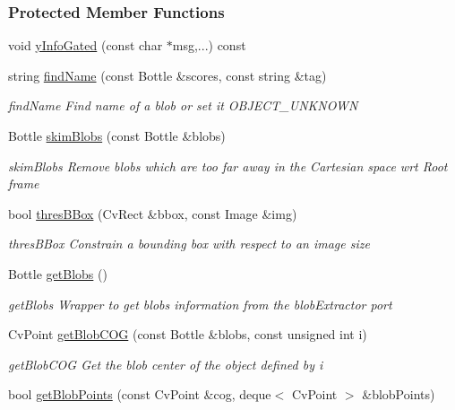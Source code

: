 \subsubsection*{Protected Member Functions}
\begin{DoxyCompactItemize}
\item 
void \hyperlink{group__iol2opc_af5370b7c2c0625d22cd9464914c74ab7}{y\+Info\+Gated} (const char $\ast$msg,...) const
\item 
string \hyperlink{group__iol2opc_a5e0675c4593af9ce2c6a04c77732811a}{find\+Name} (const Bottle \&scores, const string \&tag)
\begin{DoxyCompactList}\small\item\em find\+Name Find name of a blob or set it O\+B\+J\+E\+C\+T\+\_\+\+U\+N\+K\+N\+O\+WN \end{DoxyCompactList}\item 
Bottle \hyperlink{group__iol2opc_ac15a56e6429ba763d3ac515906e5b0b9}{skim\+Blobs} (const Bottle \&blobs)
\begin{DoxyCompactList}\small\item\em skim\+Blobs Remove blobs which are too far away in the Cartesian space wrt Root frame \end{DoxyCompactList}\item 
bool \hyperlink{group__iol2opc_ac1eda5d663ae0e5d70857ffebea03c7b}{thres\+B\+Box} (Cv\+Rect \&bbox, const Image \&img)
\begin{DoxyCompactList}\small\item\em thres\+B\+Box Constrain a bounding box with respect to an image size \end{DoxyCompactList}\item 
Bottle \hyperlink{group__iol2opc_a628771932e6423ccd5963290558436b7}{get\+Blobs} ()
\begin{DoxyCompactList}\small\item\em get\+Blobs Wrapper to get blobs information from the blob\+Extractor port \end{DoxyCompactList}\item 
Cv\+Point \hyperlink{group__iol2opc_a9990bcbf744a34e01711e47a2a8a9205}{get\+Blob\+C\+OG} (const Bottle \&blobs, const unsigned int i)
\begin{DoxyCompactList}\small\item\em get\+Blob\+C\+OG Get the blob center of the object defined by i \end{DoxyCompactList}\item 
bool \hyperlink{group__iol2opc_a8afddd23b4706e3d50ec6e5abb5141ce}{get\+Blob\+Points} (const Cv\+Point \&cog, deque$<$ Cv\+Point $>$ \&blob\+Points)

\end{DoxyCompactItemize}
